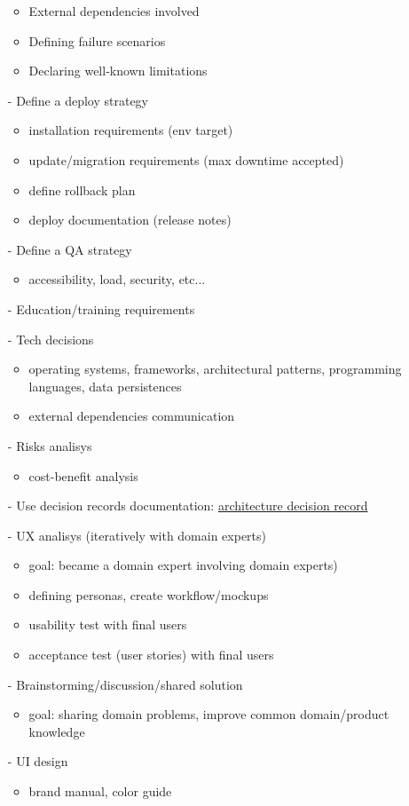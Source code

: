 \documentclass[
	fontsize=10pt, %
	twoside=false, %
	secnumdepth=1, %
]{kaobook}
\begin{document}
\begin{itemize}
\begin{itemize}
				\item External dependencies involved
				\item Defining failure scenarios
				\item Declaring well-known limitations
			\end{itemize}
		\item[-] Define a deploy strategy
			\begin{itemize}
				\item installation requirements (env target)
				\item update/migration requirements (max downtime accepted)
				\item define rollback plan
				\item deploy documentation (release notes)
			\end{itemize}
		\item[-] Define a QA strategy
			\begin{itemize}
				\item accessibility, load, security, etc...
			\end{itemize}
		\item[-] Education/training requirements
		\item[-] Tech decisions
			\begin{itemize}
				\item operating systems, frameworks, architectural patterns, programming languages, data persistences
				\item external dependencies communication
			\end{itemize}
		\item[-] Risks analisys
			\begin{itemize}
				\item cost-benefit analysis
			\end{itemize}
		\item[-] Use decision records documentation: \href{https://github.com/joelparkerhenderson/architecture-decision-record}{architecture decision record}
		\item[-] UX analisys (iteratively with domain experts)
			\begin{itemize}
				\item goal: became a domain expert involving domain experts)
				\item defining personas, create workflow/mockups
				\item usability test with final users
				\item acceptance test (user stories) with final users
			\end{itemize}
		\item[-] Brainstorming/discussion/shared solution
			\begin{itemize}
				\item goal: sharing domain problems, improve common domain/product knowledge
			\end{itemize}
		\item[-] UI design
			\begin{itemize}
				\item brand manual, color guide
			\end{itemize}
	\end{itemize}
\end{document}
